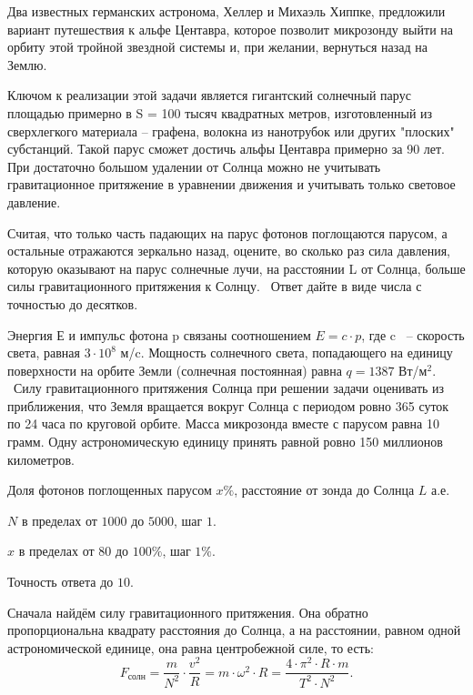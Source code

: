 
Два известных
германских астронома, Хеллер и Михаэль Хиппке, предложили
вариант путешествия к альфе Центавра, которое позволит микрозонду выйти
на орбиту этой тройной звездной системы и, при желании, вернуться
назад на Землю.

Ключом к реализации этой задачи является гигантский солнечный парус
площадью примерно в S = 100 тысяч
квадратных метров, изготовленный из сверхлегкого материала – графена,
волокна из нанотрубок или других "плоских" субстанций.
Такой парус сможет достичь альфы Центавра примерно за 90 лет. При
достаточно большом удалении от Солнца можно не учитывать гравитационное
притяжение в уравнении движения и учитывать только световое давление.  

Считая, что только часть  падающих на парус фотонов поглощаются парусом, а остальные отражаются зеркально назад, оцените, во сколько раз сила давления, которую оказывают на парус солнечные лучи, на расстоянии L  от Солнца, больше силы гравитационного притяжения к Солнцу.  Ответ дайте в виде числа с точностью до десятков.

Энергия Е и импульс фотона p связаны соотношением $E = c \cdot p$, где c  – скорость света, равная $3 \cdot 10^8$ м/c. Мощность
солнечного света, попадающего на единицу поверхности на орбите Земли (солнечная
постоянная) равна  $q = 1387$ Вт/м$^2$.  Силу гравитационного притяжения Солнца при решении задачи
оценивать из приближения, что Земля вращается вокруг Солнца с периодом ровно
365 суток по 24 часа по круговой орбите. Масса микрозонда вместе с парусом
равна 10 грамм. Одну астрономическую единицу принять равной ровно 150 миллионов
километров.

Доля фотонов поглощенных парусом $x\%$, расстояние от зонда до Солнца $L$ а.е.

\paramSection

$N$ в пределах от $1000$ до $5000$, шаг  $1$.  

$x$ в пределах от $80$ до $100 \%$, шаг  $1 \%$.  

Точность ответа  до  $10$.

\solutionSection

Сначала найдём силу гравитационного притяжения. Она обратно пропорциональна квадрату расстояния до 
Солнца, а на расстоянии, равном одной астрономической единице, она равна центробежной силе, то есть:  
$$F_{\text{солн}}=\frac{m}{N^2}  \cdot \frac{v^2}{R}=m \cdot \omega ^2 \cdot R=\frac{4 \cdot \pi^2 \cdot R \cdot m}{T^2 \cdot N^2}.$$

